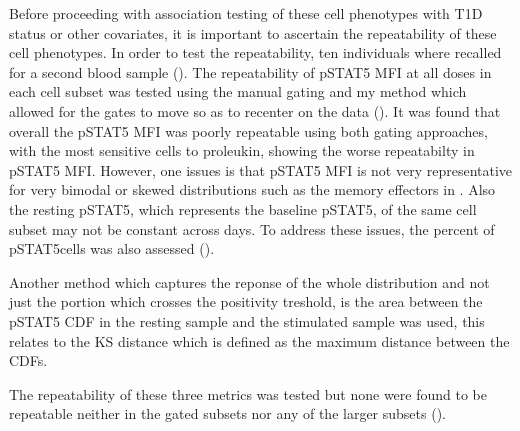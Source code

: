 Before proceeding with association testing of these cell phenotypes with T1D status or other covariates,
it is important to ascertain the repeatability of these cell phenotypes.
In order to test the repeatability, ten individuals where recalled for a second blood sample ().
The repeatability of pSTAT5 MFI at all doses in each cell subset was tested using the manual gating and my method which allowed for
the gates to move so as to recenter on the data ().
It was found that overall the pSTAT5 MFI was poorly repeatable using both gating approaches,
with the most sensitive cells to proleukin, showing the worse repeatabilty in pSTAT5 MFI.
However, one issues is that pSTAT5 MFI is not very representative for very bimodal or skewed distributions such
as the memory effectors in .
Also the resting pSTAT5, which represents the baseline pSTAT5, of the same cell subset may not be constant across days.  
To address these issues, the percent of pSTAT5\positive cells was also assessed ().

Another method which captures the reponse of the whole distribution and not just the portion which crosses the positivity treshold,
is the area between the pSTAT5 CDF in the resting sample and the stimulated sample was used,
this relates to the KS distance which is defined as the maximum distance between the CDFs.


The repeatability of these three metrics was tested but none were found to be repeatable neither in the gated subsets nor any of the larger subsets ().



